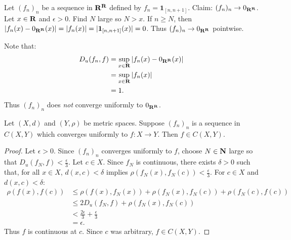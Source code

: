 \documentclass[11pt,twoside,openany]{memoir}
\begin{document}
    \begin{example}
        Let $(f_n)_n$ be a sequence in $\mathbf{R}^{\mathbf{R}}$ defined by $f_n = \mathbf{1}_{[n,n+1]}$. Claim: $(f_n)_n \rightarrow 0_{\mathbf{R}^{\mathbf{R}}}$. Let $x \in \mathbf{R}$ and $\epsilon > 0$. Find $N$ large so $N > x$. If $n \geq N$, then $|f_n(x) - 0_{\mathbf{R}^{\mathbf{R}}}(x)| = |f_n(x)| = |\mathbf{1}_{[n,n+1]}(x)| = 0$. Thus $(f_n)_n \rightarrow 0_{\mathbf{R}^{\mathbf{R}}}$ pointwise.

        Note that:
            \begin{equation*}
            \begin{split}
                D_u(f_n,f)
                & = \sup_{x \in \mathbf{R}}|f_n(x) - 0_{\mathbf{R}^{\mathbf{R}}}(x)| \\
                & = \sup_{x \in \mathbf{R}}|f_n(x)| \\
                & = 1.
            \end{split}
            \end{equation*}
        Thus $(f_n)_n$ does \textit{not} converge uniformly to $0_{\mathbf{R}^{\mathbf{R}}}$.
    \end{example}

    \begin{proposition}\label{prop:seq-cont}
       Let $(X,d)$ and $(Y,\rho)$ be metric spaces. Suppose $(f_n)_n$ is a sequence in $C(X,Y)$ which converges uniformly to $f:X \rightarrow Y$. Then $f \in C(X,Y)$.
    \end{proposition}
        \begin{proof}
            Let $\epsilon > 0$. Since $(f_n)_n$ converges uniformly to $f$, choose $N \in \mathbf{N}$ large so that $D_u(f_N,f) < \frac{\epsilon}{3}$. Let $c \in X$. Since $f_N$ is continuous, there exists $\delta > 0$ such that, for all $x \in X$, $d(x,c) < \delta$ implies $\rho(f_N(x),f_N(c))< \frac{\epsilon}{3}$. For $c \in X$ and $d(x,c) < \delta$:
                \begin{equation*}
                \begin{split}
                    \rho(f(x),f(c))
                    & \leq \rho(f(x),f_N(x)) + \rho(f_N(x),f_N(c)) + \rho(f_N(c),f(c)) \\
                    & \leq 2 D_u(f_N,f) + \rho(f_N(x), f_N(c)) \\
                    & < \frac{2 \epsilon}{3} + \frac{\epsilon}{3} \\
                    & = \epsilon.
                \end{split}
                \end{equation*}
            Thus $f$ is continuous at $c$. Since $c$ was arbitrary, $f \in C(X,Y)$.
        \end{proof}
\end{document}
